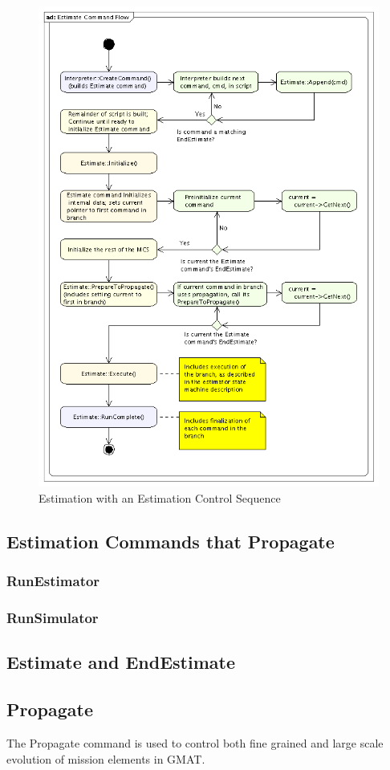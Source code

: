 \begin{figure}[htbp]
\centering
\includegraphics[315,445]{Images/EstimateCommandFlow.png}
\caption{Estimation with an Estimation Control Sequence}
\label{fig:EstimateCommandOverview}
\end{figure}



\subsection{Estimation Commands that Propagate}

\subsubsection{RunEstimator}

\subsubsection{RunSimulator}



\subsection{Estimate and EndEstimate}

\subsection{Propagate}

The Propagate command is used to control both fine grained and large scale evolution of mission
elements in GMAT.